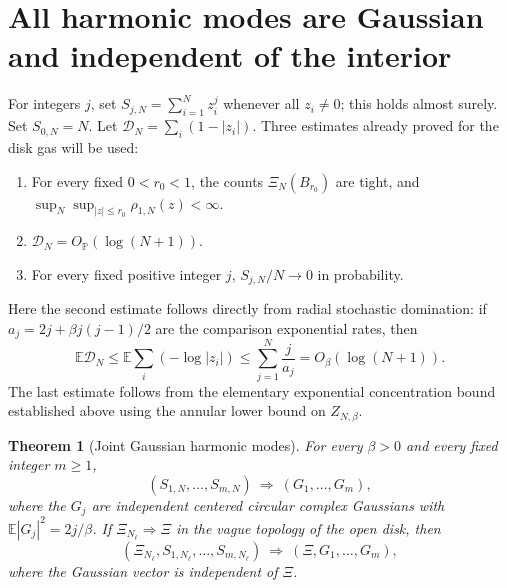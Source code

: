 \documentclass[11pt,a4paper]{article}
\numberwithin{equation}{section}
\newtheorem{theorem}{Theorem}[section]
\theoremstyle{definition}
\theoremstyle{remark}
\begin{document}
\section{All harmonic modes are Gaussian and independent of the interior}

For integers $j$, set $S_{j,N}=\sum_{i=1}^N z_i^j$ whenever all $z_i\ne0$;
this holds almost surely. Set $S_{0,N}=N$. Let
$\mathcal D_N=\sum_i(1-|z_i|)$. Three estimates already proved for the disk gas will
be used:
\begin{enumerate}
\item For every fixed $0<r_0<1$, the counts $\Xi_N(B_{r_0})$ are tight,
and $\sup_N\sup_{|z|\le r_0}\rho_{1,N}(z)<\infty$.
\item $\mathcal D_N=O_{\mathbb P}(\log(N+1))$.
\item For every fixed positive integer $j$, $S_{j,N}/N\to0$ in probability.
\end{enumerate}
Here the second estimate follows directly from radial stochastic domination:
if $a_j=2j+\beta j(j-1)/2$ are the comparison exponential rates, then
\[
 \mathbb E\mathcal D_N\le\mathbb E\sum_i(-\log|z_i|)
 \le\sum_{j=1}^N\frac{j}{a_j}=O_\beta(\log(N+1)).
\]
The last estimate follows from the elementary exponential concentration
bound established above using the annular lower bound on $Z_{N,\beta}$.

\begin{theorem}[Joint Gaussian harmonic modes]\label{thm:all-harmonic-modes}
For every $\beta>0$ and every fixed integer $m\ge1$,
\[
 (S_{1,N},\ldots,S_{m,N})\ \Longrightarrow\ (G_1,\ldots,G_m),
\]
where the $G_j$ are independent centered circular complex Gaussians with
$\mathbb E|G_j|^2=2j/\beta$. If
$\Xi_{N_\ell}\Rightarrow\Xi$ in the vague topology of the open disk, then
\[
 (\Xi_{N_\ell},S_{1,N_\ell},\ldots,S_{m,N_\ell})
 \ \Longrightarrow\ (\Xi,G_1,\ldots,G_m),
\]
where the Gaussian vector is independent of $\Xi$.
\end{theorem}
\end{document}

